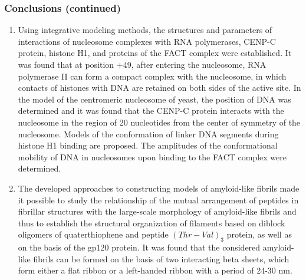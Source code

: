 \begin{frame}%
    \frametitle{Conclusions (continued)}

\begin{enumerate}
\justifying
\scriptsize

  \item Using integrative modeling methods, the structures and parameters of interactions of nucleosome complexes with RNA polymerases, CENP-C protein, histone H1, and proteins of the FACT complex were established. It was found that at position +49, after entering the nucleosome, RNA polymerase II can form a compact complex with the nucleosome, in which contacts of histones with DNA are retained on both sides of the active site. In the model of the centromeric nucleosome of yeast, the position of DNA was determined and it was found that the CENP-C protein interacts with the nucleosome in the region of 20 nucleotides from the center of symmetry of the nucleosome. Models of the conformation of linker DNA segments during histone H1 binding are proposed. The amplitudes of the conformational mobility of DNA in nucleosomes upon binding to the FACT complex were determined.
  

 \item The developed approaches to constructing models of amyloid-like fibrils made it possible to study the relationship of the mutual arrangement of peptides in fibrillar structures with the large-scale morphology of amyloid-like fibrils and thus to establish the structural organization of filaments based on diblock oligomers of quaterthiophene and peptide $(Thr-Val)_3$ protein, as well as on the basis of the gp120 protein. It was found that the considered amyloid-like fibrils can be formed on the basis of two interacting beta sheets, which form either a flat ribbon or a left-handed ribbon with a period of 24-30 nm.

\end{enumerate}
\end{frame}


